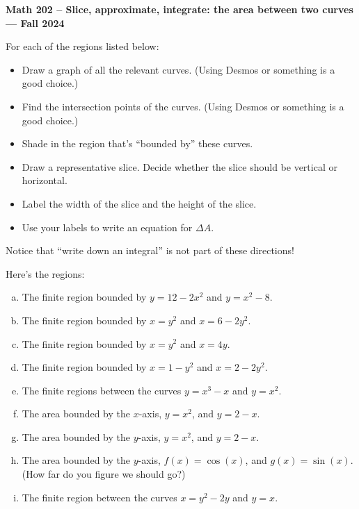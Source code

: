 \documentclass[12pt]{article}
\begin{document}
\thispagestyle{empty}
\begin{center}
  \textbf{ Math 202 -- Slice, approximate, integrate: the area between two curves
  --- Fall 2024
    }
\end{center}

For each of the regions listed below:

\begin{itemize}
    \item Draw a graph of all the relevant curves. (Using Desmos or something is a good choice.)
    \item Find the intersection points of the curves. (Using Desmos or something is a good choice.)
    \item Shade in the region that's ``bounded by'' these curves.
    \item Draw a representative slice. Decide whether the slice should be vertical or horizontal.
    \item Label the width of the slice and the height of the slice.
    \item Use your labels to write an equation for $\Delta A$.
\end{itemize}
Notice that ``write down an integral'' is not part of these directions!
\vfill

Here's the regions:

\begin{enumerate}[a.]
\item The finite region bounded by $y=12-2x^2$ and $y=x^2-8$.
\item The finite region bounded by $x=y^2$ and $x=6-2y^2$.
\item The finite region bounded by $x=y^2$ and $x=4y$.
\item The finite region bounded by $x=1-y^2$ and $x=2-2y^2$.
\item The finite regions between the curves $y=x^3-x$ and $y=x^2$.
\item The area bounded by the $x$-axis, $y=x^2$, and $y=2-x$.
\item The area bounded by the $y$-axis, $y=x^2$, and $y=2-x$.
\item The area bounded by the $y$-axis, $f(x)=\cos(x)$, and $g(x)=\sin(x)$. \\(How far do you figure we should go?)
\item The finite region between the curves $x=y^2-2y$ and $y=x$.
\end{enumerate}
\end{document}
